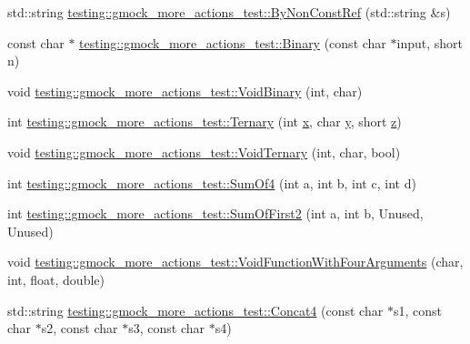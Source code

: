 \begin{DoxyCompactItemize}
\item 
std\+::string \mbox{\hyperlink{namespacetesting_1_1gmock__more__actions__test_acfdfdaebbbbfc2f9129f29b10cb42eee}{testing\+::gmock\+\_\+more\+\_\+actions\+\_\+test\+::\+By\+Non\+Const\+Ref}} (std\+::string \&s)
\item 
const char $\ast$ \mbox{\hyperlink{namespacetesting_1_1gmock__more__actions__test_ad772cefe4443030c4b50e0d497d0edbb}{testing\+::gmock\+\_\+more\+\_\+actions\+\_\+test\+::\+Binary}} (const char $\ast$input, short n)
\item 
void \mbox{\hyperlink{namespacetesting_1_1gmock__more__actions__test_aec71bd163ae67ec97e073bd13a4ac039}{testing\+::gmock\+\_\+more\+\_\+actions\+\_\+test\+::\+Void\+Binary}} (int, char)
\item 
int \mbox{\hyperlink{namespacetesting_1_1gmock__more__actions__test_ab98b352528a0b72625b4710a6fc648a1}{testing\+::gmock\+\_\+more\+\_\+actions\+\_\+test\+::\+Ternary}} (int \mbox{\hyperlink{_obj__test_2lib_2googletest-master_2googlemock_2test_2gmock-matchers__test_8cc_a6150e0515f7202e2fb518f7206ed97dc}{x}}, char \mbox{\hyperlink{_obj__test_2lib_2googletest-master_2googlemock_2test_2gmock-matchers__test_8cc_a39cb44155237f0205e0feb931d5acbed}{y}}, short \mbox{\hyperlink{_obj__test_2lib_2googletest-master_2googlemock_2test_2gmock-matchers__test_8cc_a196ff6a287f53f758b1506f21269fc77}{z}})
\item 
void \mbox{\hyperlink{namespacetesting_1_1gmock__more__actions__test_ac41b49dc8ab365ccad7b332796421cd4}{testing\+::gmock\+\_\+more\+\_\+actions\+\_\+test\+::\+Void\+Ternary}} (int, char, bool)
\item 
int \mbox{\hyperlink{namespacetesting_1_1gmock__more__actions__test_a41c348fff8608825239a276b8426a475}{testing\+::gmock\+\_\+more\+\_\+actions\+\_\+test\+::\+Sum\+Of4}} (int a, int b, int c, int d)
\item 
int \mbox{\hyperlink{namespacetesting_1_1gmock__more__actions__test_aaa60ddffb96ddc3a73b0b22929ca5bec}{testing\+::gmock\+\_\+more\+\_\+actions\+\_\+test\+::\+Sum\+Of\+First2}} (int a, int b, Unused, Unused)
\item 
void \mbox{\hyperlink{namespacetesting_1_1gmock__more__actions__test_a8c952be61635486e84c1eca3bf3acd9b}{testing\+::gmock\+\_\+more\+\_\+actions\+\_\+test\+::\+Void\+Function\+With\+Four\+Arguments}} (char, int, float, double)
\item 
std\+::string \mbox{\hyperlink{namespacetesting_1_1gmock__more__actions__test_a753ab28ecaa4133f11f9e34441b04595}{testing\+::gmock\+\_\+more\+\_\+actions\+\_\+test\+::\+Concat4}} (const char $\ast$s1, const char $\ast$s2, const char $\ast$s3, const char $\ast$s4)

\end{DoxyCompactItemize}
